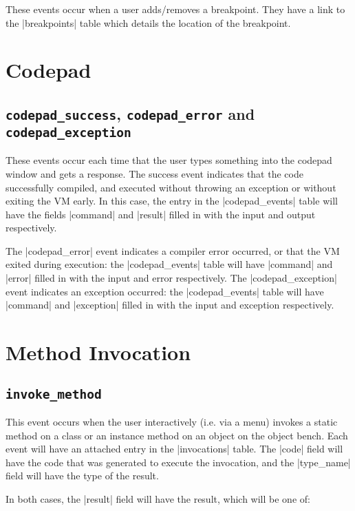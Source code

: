 \documentclass{book}
\begin{document}
These events occur when a user adds/removes a breakpoint.  They have a link to
the |breakpoints| table which details the location of the breakpoint.

\section{Codepad}


\subsection{\lstinline|codepad_success|, \lstinline|codepad_error| and
  \lstinline|codepad_exception|}

These events occur each time that the user types something into the codepad
window and gets a response.  The success event indicates that the code
successfully compiled, and executed without throwing an exception or without
exiting the VM early.  In this case, the entry in the |codepad_events| table
will have the fields |command| and |result| filled in with the input and
output respectively.

The |codepad_error| event indicates a compiler error occurred, or that the VM
exited during execution: the
|codepad_events| table will have |command| and |error| filled in with the
input and error respectively.  The |codepad_exception| event indicates an exception occurred: the
|codepad_events| table will have |command| and |exception| filled in with the
input and exception respectively.

\section{Method Invocation}


\subsection{\lstinline|invoke_method|}

This event occurs when the user interactively (i.e. via a menu) invokes a
static method on a class or an instance method on an object on the object
bench.  Each event will have an attached entry in the |invocations| table.
The |code| field will have the
code that was generated to execute the invocation, and the |type_name| field
will have the type of the result.

In both cases, the |result| field will have the result, which will be one of:
\end{document}
